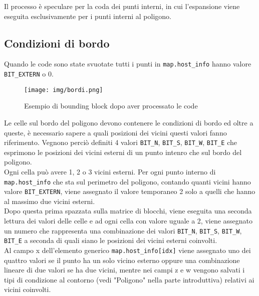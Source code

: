 			Il processo \`{e} speculare per la coda dei punti interni, in cui l'espansione viene eseguita esclusivamente per i punti interni al poligono.
		\subsection{Condizioni di bordo}
				Quando le code sono state svuotate tutti i punti in \texttt{map.host\_info} hanno valore \texttt{BIT\_EXTERN} o 0. 
				\begin{figure}[!htbp]
					\centering
					\texttt{[image: img/bordi.png]}
					\caption{Esempio di bounding block dopo aver processato le code}
				\end{figure}
				Le celle sul bordo del poligono devono contenere le condizioni di bordo ed oltre a queste, \`{e} necessario sapere a quali posizioni dei vicini questi valori fanno riferimento. Vegnono perci\`{o} definiti 4 valori \texttt{BIT\_N}, \texttt{BIT\_S}, \texttt{BIT\_W}, \texttt{BIT\_E} che esprimono le posizioni dei vicini esterni di un punto intenro che sul bordo del poligono.\\
				Ogni cella pu\`{o} avere 1, 2 o 3 vicini esterni. 
				Per ogni punto interno di \texttt{map.host\_info} che sta sul perimetro del poligono, contando quanti vicini hanno valore \texttt{BIT\_EXTERN}, viene assegnato il valore temporaneo 2 solo a quelli che hanno al massimo due vicini esterni.\\
				Dopo questa prima spazzata sulla matrice di blocchi, viene eseguita una seconda lettura dei valori delle celle e ad ogni cella con valore uguale a 2, viene assegnato un numero che rappresenta una combinazione dei valori  \texttt{BIT\_N}, \texttt{BIT\_S}, \texttt{BIT\_W}, \texttt{BIT\_E} a seconda di quali siano le posizioni dei vicini esterni coinvolti. \\
				Al campo x dell'elemento generico \texttt{map.host\_info[idx]} viene assegnato uno dei quattro valori se il punto ha un solo vicino esterno oppure una combinazione lineare di due valori se ha due vicini, mentre nei campi z e w vengono salvati i tipi di condizione al contorno (vedi "Poligono" nella parte introduttiva) relativi ai vicini coinvolti.
